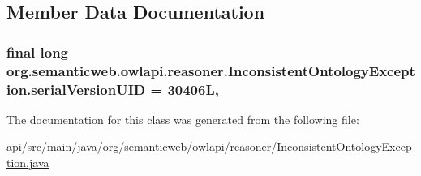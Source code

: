 \subsection{Member Data Documentation}
\hypertarget{classorg_1_1semanticweb_1_1owlapi_1_1reasoner_1_1_inconsistent_ontology_exception_af0892b5d45044dd496adc5b912d9517e}{
\subsubsection[{serial\-Version\-U\-I\-D}]{\setlength{\rightskip}{0pt plus 5cm}final long org.\-semanticweb.\-owlapi.\-reasoner.\-Inconsistent\-Ontology\-Exception.\-serial\-Version\-U\-I\-D = 30406\-L\hspace{0.3cm}{\ttfamily [static]}, {\ttfamily [private]}}}\label{classorg_1_1semanticweb_1_1owlapi_1_1reasoner_1_1_inconsistent_ontology_exception_af0892b5d45044dd496adc5b912d9517e}


The documentation for this class was generated from the following file\-:\begin{DoxyCompactItemize}
\item 
api/src/main/java/org/semanticweb/owlapi/reasoner/\hyperlink{_inconsistent_ontology_exception_8java}{Inconsistent\-Ontology\-Exception.\-java}\end{DoxyCompactItemize}
